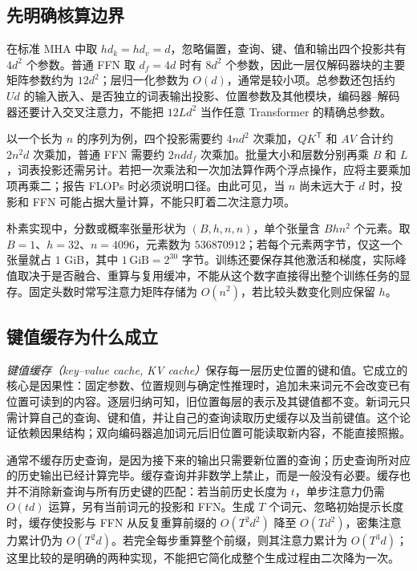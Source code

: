 \documentclass[UTF8,12pt,a4paper,fontset=fandol]{ctexart}
\begin{document}
\subsection{先明确核算边界}

在标准 MHA 中取 $hd_k=hd_v=d$，忽略偏置，查询、键、值和输出四个投影共有 $4d^2$ 个参数。普通 FFN 取 $d_f=4d$ 时有 $8d^2$ 个参数，因此一层仅解码器块的主要矩阵参数约为 $12d^2$；层归一化参数为 $O(d)$，通常是较小项。总参数还包括约 $Ud$ 的输入嵌入、是否独立的词表输出投影、位置参数及其他模块，编码器--解码器还要计入交叉注意力，不能把 $12Ld^2$ 当作任意 Transformer 的精确总参数。

以一个长为 $n$ 的序列为例，四个投影需要约 $4nd^2$ 次乘加，$QK^{\mathsf T}$ 和 $AV$ 合计约 $2n^2d$ 次乘加，普通 FFN 需要约 $2ndd_f$ 次乘加。批量大小和层数分别再乘 $B$ 和 $L$，词表投影还需另计。若把一次乘法和一次加法算作两个浮点操作，应将主要乘加项再乘二；报告 FLOPs 时必须说明口径。由此可见，当 $n$ 尚未远大于 $d$ 时，投影和 FFN 可能占据大量计算，不能只盯着二次注意力项。

朴素实现中，分数或概率张量形状为 $(B,h,n,n)$，单个张量含 $Bhn^2$ 个元素。取 $B=1$、$h=32$、$n=4096$，元素数为 $536870912$；若每个元素两字节，仅这一个张量就占 $1$ GiB，其中 $1\,\mathrm{GiB}=2^{30}$ 字节。训练还要保存其他激活和梯度，实际峰值取决于是否融合、重算与复用缓冲，不能从这个数字直接得出整个训练任务的显存。固定头数时常写注意力矩阵存储为 $O(n^2)$，若比较头数变化则应保留 $h$。

\subsection{键值缓存为什么成立}

\emph{键值缓存（key--value cache, KV cache）}保存每一层历史位置的键和值。它成立的核心是因果性：固定参数、位置规则与确定性推理时，追加未来词元不会改变已有位置可读到的内容。逐层归纳可知，旧位置每层的表示及其键值都不变。新词元只需计算自己的查询、键和值，并让自己的查询读取历史缓存以及当前键值。这个论证依赖因果结构；双向编码器追加词元后旧位置可能读取新内容，不能直接照搬。

通常不缓存历史查询，是因为接下来的输出只需要新位置的查询；历史查询所对应的历史输出已经计算完毕。缓存查询并非数学上禁止，而是一般没有必要。缓存也并不消除新查询与所有历史键的匹配：若当前历史长度为 $t$，单步注意力仍需 $O(td)$ 运算，另有当前词元的投影和 FFN。生成 $T$ 个词元、忽略初始提示长度时，缓存使投影与 FFN 从反复重算前缀的 $O(T^2d^2)$ 降至 $O(Td^2)$，密集注意力累计仍为 $O(T^2d)$。若完全每步重算整个前缀，则其注意力累计为 $O(T^3d)$；这里比较的是明确的两种实现，不能把它简化成整个生成过程由二次降为一次。
\end{document}
